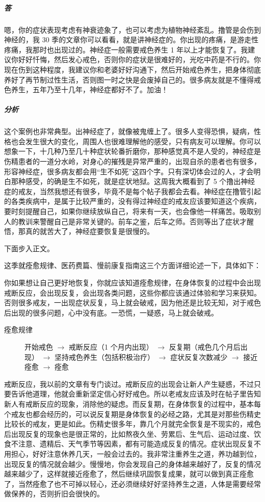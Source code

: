 \documentclass{ctexart}
\begin{document}
\begin{enumerate}
    \subparagraph{答} 嗯，你的症状表现考虑有神衰迹象了，也可以考虑为植物神经紊乱。撸管是会伤到神经的，我 30 季的文章你可以看看，就是讲神经症的。你出现的疼痛，是游走性疼痛，我那时也出现过的。神经症一般需要戒色养生 1 年以上才能恢复了。我建议你好好忏悔，然后发心戒色，否则你的症状是很难好的，光吃中药是不行的。你现在伤到这种程度，我建议你和老婆好好沟通下，然后开始戒色养生，把身体彻底养好了再节制过性生活，否则图一时之快是会废掉自己的。很多病友就是不懂得戒色养生，五年乃至十几年，神经症都好不了。加油！
    \subparagraph{分析} 这个案例也非常典型。出神经症了，就像被鬼缠上了。很多人变得恐惧，疑病，性格也会发生很大的变化，周围人也很难理解他的感受，只有病友可以理解。你可以想象一下，十几种乃至几十种症状轮番折磨你，那种感觉真不是人受的，神经症是伤精患者的一道分水岭，对身心的摧残是异常严重的，出现自杀的患者也有很多，形容神经症，很多病友都会用“生不如死”这四个字。只有深切体会过的人，才会明白那种感受，的确是生不如死，就是症状地狱。这周我大概看到了 5 个撸出神经症的戒友，当然我想还有很多，毕竟不是每个帖子我都会去看。神经症在撸管引起的各类疾病中，是属于比较严重的，没有得过神经症的戒友应该要知道这个疾病，要时刻提醒自己，如果你继续放纵自己，将来有一天，也会像他一样痛苦。吸取别人的教训来警醒自己是非常关键的。前车之鉴，后车之师。否则等出了症状才醒悟，那真的就苦大了，神经症要恢复是很慢的。
\end{enumerate}

下面步入正文。

这季就痊愈规律、医药费篇、慢前康复指南这三个方面详细论述一下，具体如下：

你如果想让自己更好地恢复，你就应该知道痊愈规律，在身体恢复的过程中会出现戒断反应，会出现反复，会出现各类问题，这些你都应该通过体验和学习来获知。否则很多戒友，一出现症状反复，马上就会破戒，因为他还是比较无知，对于戒色后出现的很多问题，心中没有底。一恐慌，一疑惑，马上就会破戒。

\begin{description}
    \item[痊愈规律]
    开始戒色 $\to$ 戒断反应（1 个月内出现） $\to$ 反复期（戒色几个月后出现） $\to$ 坚持戒色养生（包括积极治疗） $\to$ 症状反复次数减少 $\to$ 接近痊愈 $\to$ 痊愈
\end{description}

戒断反应，我以前的文章有专门谈过。戒断反应的出现会让新人产生疑惑，不过只要告诉他道理，他就会重新坚定信心好好戒色。所以老戒友应该及时在帖子里告知新人有戒断反应的现象，消除他的疑虑。而反复期，在身体恢复的过程中，基本每个戒友也都会经历的，可以说反复期是身体恢复的必经之路，尤其是对那些伤精史比较长的戒友，更是如此。伤精史很多年，靠几个月就完全恢复是不现实的，戒色后出现反复的现象也是很正常的，比如熬夜久坐、劳累后、生气后、运动过度、饮食不注意、遗精后、天气季节等因素，都有可能造成反复的情况。症状出现反复不用担心，好好注意休养几天，一般会过去的。我非常注重养生之道，养功越到位，出现反复的情况就会越少。慢慢地，你会发现自己的身体越来越好了，反复的情况越来越少了，这样就接近痊愈了，然后继续巩固恢复成果，就可以做到真正痊愈了，当然痊愈了也不可掉以轻心，还必须继续好好坚持养生之道，人体是需要经常做保养的，否则折旧会很快的。
\end{document}
